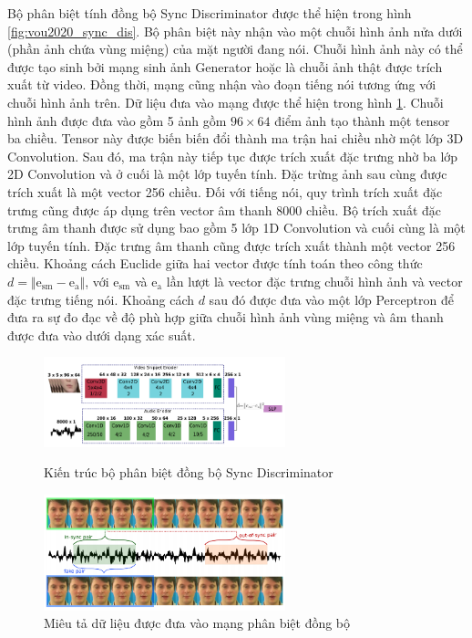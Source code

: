 Bộ phân biệt tính đồng bộ Sync Discriminator được thể hiện trong hình \ref{fig:vou2020_sync_dis}. Bộ phân biệt này nhận vào một chuỗi hình ảnh nửa dưới (phần ảnh chứa vùng miệng) của mặt người đang nói. Chuỗi hình ảnh này có thể được tạo sinh bởi mạng sinh ảnh Generator hoặc là chuỗi ảnh thật được trích xuất từ video. Đồng thời, mạng cũng nhận vào đoạn tiếng nói tương ứng với chuỗi hình ảnh trên. Dữ liệu đưa vào mạng được thể hiện trong hình \ref{fig:vou2020_sync_input}. Chuỗi hình ảnh được đưa vào gồm 5 ảnh gồm $96 \times 64$ điểm ảnh tạo thành một tensor ba chiều. Tensor này được biến biến đổi thành ma trận hai chiều nhờ một lớp 3D Convolution. Sau đó, ma trận này tiếp tục được trích xuất đặc trưng nhờ ba lớp 2D Convolution và ở cuối là một lớp tuyến tính. Đặc trừng ảnh sau cùng được trích xuất là một vector 256 chiều. Đối với tiếng nói, quy trình trích xuất đặc trưng cũng được áp dụng trên vector âm thanh 8000 chiều. Bộ trích xuất đặc trưng âm thanh được sử dụng bao gồm 5 lớp 1D Convolution và cuối cùng là một lớp tuyến tính. Đặc trưng âm thanh cũng được trích xuất thành một vector 256 chiều. Khoảng cách Euclide giữa hai vector được tính toán theo công thức $d = \Vert \textrm{e}_{\textrm{sm}} - \textrm{e}_{\textrm{a}} \Vert$, với $\textrm{e}_{\textrm{sm}}$ và $\textrm{e}_{\textrm{a}}$ lần lượt là vector đặc trưng chuỗi hình ảnh và vector đặc trưng tiếng nói. Khoảng cách $d$ sau đó được đưa vào một lớp Perceptron để đưa ra sự đo đạc về độ phù hợp giữa chuỗi hình ảnh vùng miệng và âm thanh được đưa vào dưới dạng xác suất.

\begin{figure}[H]
    \centering
    \begin{minipage}{0.48\textwidth}
        \includegraphics[width=7cm]{./content/images/vou2020_sync_dis.png}
        \caption{Kiến trúc bộ phân biệt đồng bộ Sync Discriminator}
        \label{fig:vou2020_sync_dis}
    \end{minipage}\hfill
    \begin{minipage}{0.48\textwidth}
        \includegraphics[width=7cm]{./content/images/vou2020_sync_input.png}
        \caption{Miêu tả dữ liệu được đưa vào mạng phân biệt đồng bộ}
        \label{fig:vou2020_sync_input}
    \end{minipage}
\end{figure}

